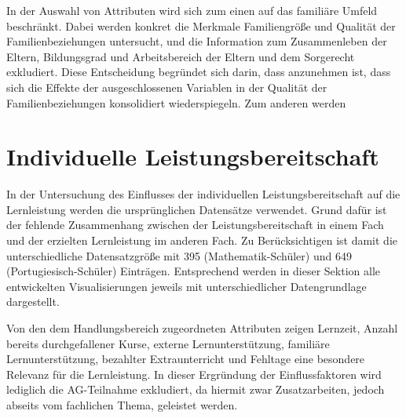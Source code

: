 In der Auswahl von Attributen wird sich zum einen auf das familiäre Umfeld beschränkt. 
Dabei werden konkret die Merkmale Familiengröße und Qualität der Familienbeziehungen untersucht, und die Information zum Zusammenleben der Eltern, Bildungsgrad und Arbeitsbereich der Eltern und dem Sorgerecht exkludiert.
Diese Entscheidung begründet sich darin, dass anzunehmen ist, dass sich die Effekte der ausgeschlossenen Variablen in der Qualität der Familienbeziehungen konsolidiert wiederspiegeln.
Zum anderen werden 


\section{Individuelle Leistungsbereitschaft}

In der Untersuchung des Einflusses der individuellen Leistungsbereitschaft auf die Lernleistung werden die ursprünglichen Datensätze verwendet.
Grund dafür ist der fehlende Zusammenhang zwischen der Leistungsbereitschaft in einem Fach und der erzielten Lernleistung im anderen Fach.
Zu Berücksichtigen ist damit die unterschiedliche Datensatzgröße mit 395 (Mathematik-Schüler) und 649 (Portugiesisch-Schüler) Einträgen.
Entsprechend werden in dieser Sektion alle entwickelten Visualisierungen jeweils mit unterschiedlicher Datengrundlage dargestellt.

Von den dem Handlungsbereich zugeordneten Attributen zeigen Lernzeit, Anzahl bereits durchgefallener Kurse, externe Lernunterstützung, familiäre Lernunterstützung, bezahlter Extraunterricht und Fehltage eine besondere Relevanz für die Lernleistung. 
In dieser Ergründung der Einflussfaktoren wird lediglich die AG-Teilnahme exkludiert, da hiermit zwar Zusatzarbeiten, jedoch abseits vom fachlichen Thema, geleistet werden.

    
